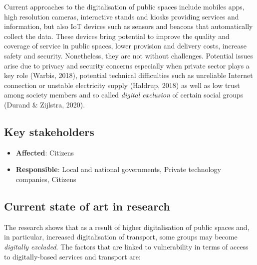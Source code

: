 \documentclass[
]{book}
\providecommand{\tightlist}{%
  \setlength{\itemsep}{0pt}\setlength{\parskip}{0pt}}
\begin{document}
Current approaches to the digitalisation of public spaces include mobiles apps, high resolution cameras, interactive stands and kiosks providing services and information, but also IoT devices such as sensors and beacons that automatically collect the data. These devices bring potential to improve the quality and coverage of service in public spaces, lower provision and delivery costs, increase safety and security. Nonetheless, they are not without challenges. Potential issues arise due to privacy and security concerns especially when private sector plays a key role (Warbis, 2018), potential technical difficulties such as unreliable Internet connection or unstable electricity supply (Haldrup, 2018) as well as low trust among society members and so called \emph{digital exclusion} of certain social groups (Durand \& Zijlstra, 2020).

\hypertarget{key-stakeholders-5}{%
\subsection*{Key stakeholders}\label{key-stakeholders-5}}

\begin{itemize}
\tightlist
\item
  \textbf{Affected}: Citizens
\item
  \textbf{Responsible}: Local and national governments, Private technology companies, Citizens
\end{itemize}

\hypertarget{current-state-of-art-in-research-5}{%
\subsection*{Current state of art in research}\label{current-state-of-art-in-research-5}}

The research shows that as a result of higher digitalisation of public spaces and, in particular, increased digitalisation of transport, some groups may become \emph{digitally excluded}. The factors that are linked to vulnerability in terms of access to digitally-based services and transport are:
\end{document}
